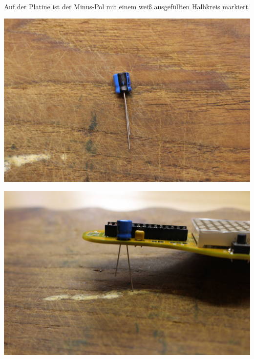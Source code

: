 \documentclass{article}
\begin{document}
Auf der Platine ist der Minus-Pol mit einem weiß ausgefüllten Halbkreis markiert.

\begin{minipage}[b]{0.5\textwidth}
	\includegraphics[width=\textwidth]{Bilder/IMG_5593.JPG}
	\label{fig:}
\end{minipage}
\begin{minipage}[b]{0.5\textwidth}
	\includegraphics[width=\textwidth]{Bilder/IMG_5594.JPG}
	\label{fig:}
\end{minipage}
\end{document}
